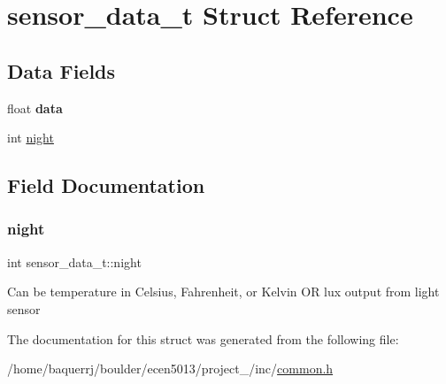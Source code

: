 \hypertarget{structsensor__data__t}{}\section{sensor\+\_\+data\+\_\+t Struct Reference}
\label{structsensor__data__t}
\subsection*{Data Fields}
\begin{DoxyCompactItemize}
\item 
\mbox{\label{structsensor__data__t_a8b1e37b53c3fe25550a9968a9c0ee321}} 
float {\bfseries data}
\item 
int \hyperlink{structsensor__data__t_a237c02f9c5f1662b2c0736c795736ca2}{night}
\end{DoxyCompactItemize}


\subsection{Field Documentation}
\mbox{\label{structsensor__data__t_a237c02f9c5f1662b2c0736c795736ca2}} 
\subsubsection{\texorpdfstring{night}{night}}
{\footnotesize\ttfamily int sensor\+\_\+data\+\_\+t\+::night}

Can be temperature in Celsius, Fahrenheit, or Kelvin OR lux output from light sensor 

The documentation for this struct was generated from the following file\+:\begin{DoxyCompactItemize}
\item 
/home/baquerrj/boulder/ecen5013/project\+\_/inc/\hyperlink{common_8h}{common.\+h}\end{DoxyCompactItemize}
